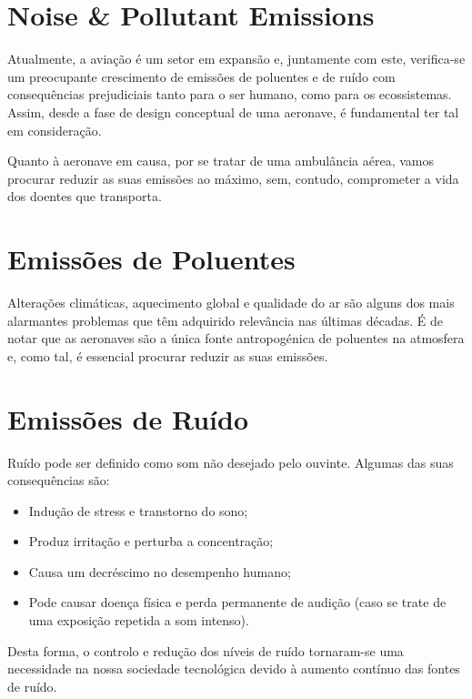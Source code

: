 \section{Noise \& Pollutant Emissions}
\label{noise}
Atualmente, a aviação é um setor em expansão e, juntamente com este, verifica-se um preocupante crescimento de emissões de poluentes e de ruído com consequências prejudiciais tanto para o ser humano, como para os ecossistemas. Assim, desde a fase de design conceptual de uma aeronave, é fundamental ter tal em consideração.

Quanto à aeronave em causa, por se tratar de uma ambulância aérea, vamos procurar reduzir as suas emissões ao máximo, sem, contudo, comprometer a vida dos doentes que transporta.

\section{Emissões de Poluentes}
Alterações climáticas, aquecimento global e qualidade do ar são alguns dos mais alarmantes problemas que têm adquirido relevância nas últimas décadas. É de notar que as aeronaves são a única fonte antropogénica de poluentes na atmosfera e, como tal, é essencial procurar reduzir as suas emissões. %





\section{Emissões de Ruído}
Ruído pode ser definido como som não desejado pelo ouvinte. Algumas das suas consequências são:

\begin{itemize}
    \item Indução de stress e transtorno do sono;
    \item Produz irritação e perturba a concentração;
    \item Causa um decréscimo no desempenho humano;
    \item Pode causar doença física e perda permanente de audição (caso se trate de uma exposição repetida a som intenso).
\end{itemize}

Desta forma, o controlo e redução dos níveis de ruído tornaram-se uma necessidade na nossa sociedade tecnológica devido à aumento contínuo das fontes de ruído.